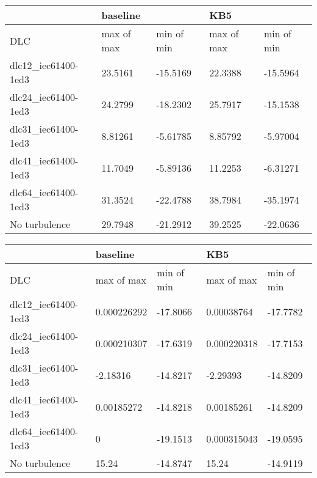 \begin{tabular}{lllll}
\toprule
                     & \multicolumn{2}{l}{baseline} &         KB5 &\\
\midrule
                 DLC &  max of max &  min of min &  max of max &  min of min \\
 dlc12\_iec61400-1ed3 &     23.5161 &    -15.5169 &     22.3388 &    -15.5964 \\
 dlc24\_iec61400-1ed3 &     24.2799 &    -18.2302 &     25.7917 &    -15.1538 \\
 dlc31\_iec61400-1ed3 &     8.81261 &    -5.61785 &     8.85792 &    -5.97004 \\
 dlc41\_iec61400-1ed3 &     11.7049 &    -5.89136 &     11.2253 &    -6.31271 \\
 dlc64\_iec61400-1ed3 &     31.3524 &    -22.4788 &     38.7984 &    -35.1974 \\
    No turbulence &     29.7948 &    -21.2912 &     39.2525 &    -22.0636 \\
\bottomrule
\end{tabular}


\begin{tabular}{lllll}
\toprule
                     & \multicolumn{2}{l}{baseline} &          KB5 &\\
\midrule
                 DLC &   max of max &  min of min &   max of max &  min of min \\
 dlc12\_iec61400-1ed3 &  0.000226292 &    -17.8066 &   0.00038764 &    -17.7782 \\
 dlc24\_iec61400-1ed3 &  0.000210307 &    -17.6319 &  0.000220318 &    -17.7153 \\
 dlc31\_iec61400-1ed3 &     -2.18316 &    -14.8217 &     -2.29393 &    -14.8209 \\
 dlc41\_iec61400-1ed3 &   0.00185272 &    -14.8218 &   0.00185261 &    -14.8209 \\
 dlc64\_iec61400-1ed3 &            0 &    -19.1513 &  0.000315043 &    -19.0595 \\
    No turbulence &        15.24 &    -14.8747 &        15.24 &    -14.9119 \\
\bottomrule
\end{tabular}


\clearpage



